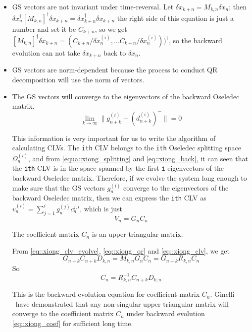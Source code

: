     \begin{itemize}
     \item GS vectors are not invariant under time-reversal.
     Let $\delta x_{k+n}=M_{k,n} \delta x_{n}$; then
     $\delta x_{n}^{\dagger}[M_{k,n}]^{\dagger}\delta x_{k+n}=\delta x_{k+n}^{\dagger} \delta x_{k+n}$
     the right side of this equation is just a number and set it be $C_{k+n}$, so we get
     $[M_{k,n}]^{\dagger}\delta x_{k+n}=(C_{k+n}/\delta x_{n}^{(i)},
     \dots C_{k+n}/ \delta x_{n}^{(i)}))^{\dagger}$, so the backward evolution can not take $\delta x_{k+n}$ back to
     $\delta x_{n}$.

     \item GS vectors are norm-dependent because the process to conduct QR decomposition will use the norm of
     vectors.

     \item The GS vectors will converge to the eigenvectors of the backward Oseledec matrix.
      \begin{equation}
       \lim_{k\to \infty} \| g^{(i)}_{n+k}-(d_{n+k}^{(i)})^{-} \| =0
      \end{equation}

      This information is very important for us to write the algorithm of calculating CLVs. The \texttt{ith}
      CLV belongs to the  \texttt{ith} Oseledec splitting space $\Omega_{n}^{(i)}$, and from
      \eqref{equa::xiong_splitting} and \eqref{eq::xiong_back}, it can seen that the \texttt{ith}
      CLV is in the space spanned by the first \texttt{i} eigenvectors of the backward Oseledec matrix.
      Therefore, if we evolve the system long enough to make sure that the GS vectors ${g^{(i)}_{n}}$ converge to
      the eigenvectors of the backward Oseledec matrix, then we can express the  \texttt{ith}
      CLV as $v_{n}^{(i)}=\sum_{j=1}^{i}g^{(j)}_{n}c_{n}^{j,i}$, which is just
      \begin{equation}
       V_{n}=G_{n}C_{n}
       \label{eq::xiong_clv}
      \end{equation}

      The coefficient matrix $C_n$ is an upper-triangular matrix.

      From \eqref{eq::xiong_clv_evolve}, \eqref{eq::xiong_qr} and \eqref{eq::xiong_clv}, we get
      \begin{equation}
       G_{n+k}C_{n+k}D_{k,n}=M_{k,n}G_{n}C_{n}=G_{n+k}R_{k,n}C_{n}
      \end{equation}
      So
      \begin{equation}
       C_{n}=R_{k,n}^{-1}C_{n+k}D_{k,n}
       \label{eq::xiong_coef}
      \end{equation}

      This is the backward evolution equation for coefficient matrix $C_n$. Ginelli \etal\
      have demonstrated that
      any non-singular upper triangular matrix will converge to the coefficient matrix $C_n$ under
      backward evolution \eqref{eq::xiong_coef} for sufficient long time.

    \end{itemize}


